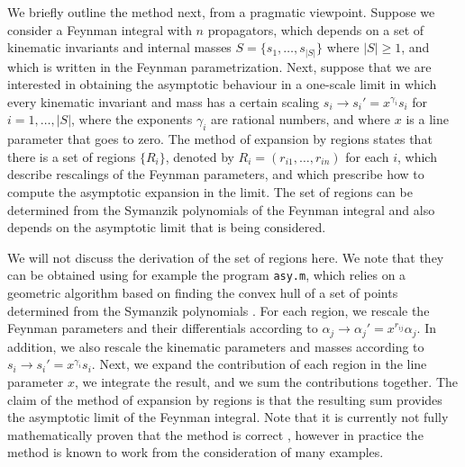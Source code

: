 \documentclass{article}
\begin{document}
We briefly outline the method next, from a pragmatic viewpoint. Suppose we consider a Feynman integral with $n$ propagators, which depends on a set of kinematic invariants and internal masses $S = \{s_1,\ldots,s_{|S|}\}$ where $|S|\geq 1$, and which is written in the Feynman parametrization. Next, suppose that we are interested in obtaining the asymptotic behaviour in a one-scale limit in which every kinematic invariant and mass has a certain scaling $s_i \rightarrow s_i' = x^{\gamma_i}s_i$ for $i = 1,\ldots,|S|$, where the exponents $\gamma_i$ are rational numbers, and where $x$ is a line parameter that goes to zero. The method of expansion by regions states that there is a set of regions $\{R_i\}$, denoted by $R_i = (r_{i1},\ldots,r_{in})$ for each $i$, which describe rescalings of the Feynman parameters, and which prescribe how to compute the asymptotic expansion in the limit. The set of regions can be determined from the Symanzik polynomials of the Feynman integral and also depends on the asymptotic limit that is being considered.

We will not discuss the derivation of the set of regions here. We note that they can be obtained using for example the program \texttt{asy.m}, which relies on a geometric algorithm based on finding the convex hull of a set of points determined from the Symanzik polynomials \cite{Jantzen:2012mw}. For each region, we rescale the Feynman parameters and their differentials according to $\alpha_j \rightarrow \alpha_j' = x^{r_{ij}}\alpha_j$. In addition, we also rescale the kinematic parameters and masses according to $s_i \rightarrow s_i' = x^{\gamma_i}s_i$. Next, we expand the contribution of each region in the line parameter $x$, we integrate the result, and we sum the contributions together. The claim of the method of expansion by regions is that the resulting sum provides the asymptotic limit of the Feynman integral. Note that it is currently not fully mathematically proven that the method is correct \cite{Semenova:2018cwy}, however in practice the method is known to work from the consideration of many examples.
\end{document}
